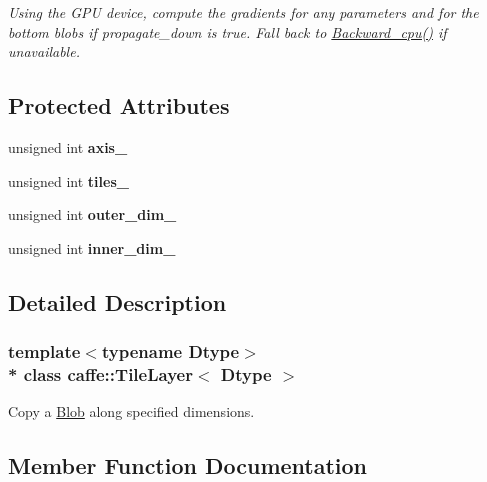 \begin{DoxyCompactItemize}
\begin{DoxyCompactList}\small\item\em Using the G\+PU device, compute the gradients for any parameters and for the bottom blobs if propagate\+\_\+down is true. Fall back to \hyperlink{classcaffe_1_1TileLayer_a9e13c19f11249c1456bc1068982f2cc6}{Backward\+\_\+cpu()} if unavailable. \end{DoxyCompactList}\end{DoxyCompactItemize}
\subsection*{Protected Attributes}
\begin{DoxyCompactItemize}
\item 
unsigned int {\bfseries axis\+\_\+}\hypertarget{classcaffe_1_1TileLayer_a6035dafd87b7b997e9cef7c1bfaff30a}{}\label{classcaffe_1_1TileLayer_a6035dafd87b7b997e9cef7c1bfaff30a}

\item 
unsigned int {\bfseries tiles\+\_\+}\hypertarget{classcaffe_1_1TileLayer_aab425e53b5d3d23d76d63d0d23f70bca}{}\label{classcaffe_1_1TileLayer_aab425e53b5d3d23d76d63d0d23f70bca}

\item 
unsigned int {\bfseries outer\+\_\+dim\+\_\+}\hypertarget{classcaffe_1_1TileLayer_a2bfae2e8ae3fbe242cbea8ec8740b7a0}{}\label{classcaffe_1_1TileLayer_a2bfae2e8ae3fbe242cbea8ec8740b7a0}

\item 
unsigned int {\bfseries inner\+\_\+dim\+\_\+}\hypertarget{classcaffe_1_1TileLayer_a46076f067d0ae4ee65c77381a067b041}{}\label{classcaffe_1_1TileLayer_a46076f067d0ae4ee65c77381a067b041}

\end{DoxyCompactItemize}


\subsection{Detailed Description}
\subsubsection*{template$<$typename Dtype$>$\\*
class caffe\+::\+Tile\+Layer$<$ Dtype $>$}

Copy a \hyperlink{classcaffe_1_1Blob}{Blob} along specified dimensions. 

\subsection{Member Function Documentation}
